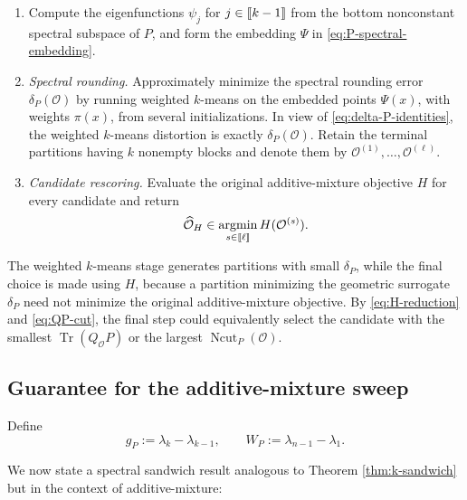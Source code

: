 \documentclass[11pt]{article}
\newcommand{\1}{\mathbf{1}}
\providecommand{\llbracket}{\mathopen{[\mkern-2.7mu[}}
\providecommand{\rrbracket}{\mathclose{]\mkern-2.7mu]}}
\begin{document}
\begin{algorithm}[H]
\caption{Additive-mixture multiway spectral sweep}
\label{alg:additive-mixture-sweep}
\begin{enumerate}
    \item Compute the eigenfunctions $\psi_j$ for
    $j\in\llbracket k-1\rrbracket$ from the bottom
    nonconstant spectral subspace of $P$, and form the embedding $\Psi$ in
    \eqref{eq:P-spectral-embedding}.
    \item \emph{Spectral rounding.} Approximately minimize the spectral rounding error
    $\delta_P(\mathcal O)$ by running weighted $k$-means on the embedded
    points $\Psi(x)$, with weights $\pi(x)$, from several
    initializations.  In view of \eqref{eq:delta-P-identities}, the
    weighted $k$-means distortion is exactly $\delta_P(\mathcal O)$.
    Retain the terminal partitions having $k$ nonempty blocks and denote
    them by
    $\mathcal O^{(1)},\ldots,\mathcal O^{(\ell)}$.
    \item \emph{Candidate rescoring.} Evaluate the original additive-mixture objective $H$ for
    every candidate and return
    \[
        \widehat{\mathcal O}_H
        \in\operatorname*{argmin}_{s\in\llbracket\ell\rrbracket}
          H(\mathcal O^{(s)}).
    \]
\end{enumerate}
\end{algorithm}

The weighted $k$-means stage generates partitions with small
$\delta_P$, while the final choice is made using $H$, because a
partition minimizing the geometric surrogate $\delta_P$ need not
minimize the original additive-mixture objective.  By
\eqref{eq:H-reduction} and \eqref{eq:QP-cut}, the final step could
equivalently select the candidate with the smallest
$\operatorname{Tr}(Q_{\mathcal O}P)$ or the largest
$\operatorname{Ncut}_P(\mathcal O)$.

\subsection{Guarantee for the additive-mixture sweep}

Define
\begin{equation}
    g_P:=\lambda_{k}-\lambda_{k-1},
    \qquad
    W_P:=\lambda_{n-1}-\lambda_1.
    \label{eq:gP-WP}
\end{equation}

We now state a spectral sandwich result analogous to Theorem \ref{thm:k-sandwich} but in the context of additive-mixture:
\end{document}
